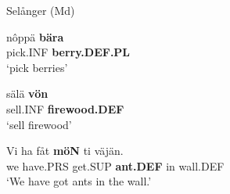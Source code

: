 
\item 

Selånger (Md)



\item 


 \ea\label{}
\gll nôppä  \textbf{bära}\\


pick.INF  \textbf{berry.DEF.PL}\\

\glt ‘pick berries’

\z

\item 


 \ea\label{}
\gll sälä  \textbf{vön} \\


sell.INF  \textbf{firewood.DEF} \\

\glt ‘sell firewood’

\z

\item 


 \ea\label{}
\gll Vi  ha  fåt  \textbf{möN} ti  väjän.  \\


we  have.PRS  get.SUP  \textbf{ant.DEF} in  wall.DEF  \\

\glt ‘We have got ants in the wall.’

\z

\item 

